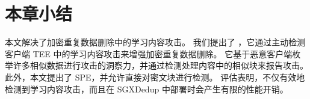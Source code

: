 \section{本章小结}
\label{sec:featurespy-conclusion}
本文解决了加密重复数据删除中的学习内容攻击。 我们提出了 \sysnameF，它通过主动检测客户端 TEE 中的学习内容攻击来增强加密重复数据删除。 它基于恶意客户端枚举许多相似数据进行攻击的洞察力，并通过检测处理内容中的相似块来报告攻击。 此外，本文提出了 SPE，并允许直接对密文块进行检测。 评估表明，\sysnameF 不仅有效地检测到学习内容攻击，而且在 SGXDedup \cite{ren21} 中部署时会产生有限的性能开销。
